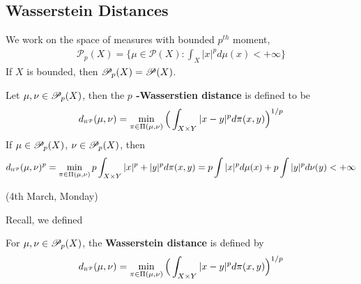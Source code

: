 \documentclass[12pt,a4paper]{article}
\begin{document}
\subsection{Wasserstein Distances}

We work on the space of measures with bounded $p^{th}$ moment,
\begin{align*}
\mathscr{P}_p(X) = \{ \mu \in \mathscr{P}(X) : \int_X |x|^p d\mu (x) < +\infty \}
\end{align*}
If $X$ is bounded, then $\mathscr{P}_p(X) = \mathscr{P}(X)$.
\s

 Let $\mu, \nu \in \mathscr{P}_p(X)$, then the \textbf{$p$ -Wasserstien distance} is defined to be
\begin{align*}
\wa{p}(\mu, \nu)= \min_{\pi \in \Pi(\mu, \nu)} \Big( \int_{X\times Y} |x-y|^p d\pi(x,y) \Big)^{1/p}
\end{align*}
If $\mu \in \mathscr{P}_p(X)$, $\nu \in  \mathscr{P}_p(X)$, then
\begin{align*}
\wa{p}(\mu, \nu)^p = \min_{\pi \in \Pi(\mu, \nu)} p\int_{X\times Y} |x|^p + |y|^p d\pi(x,y) = p\int |x|^p d\mu(x) + p \int |y|^p d\nu(y) < + \infty
\end{align*}
\s

\newday

(4th March, Monday)
\s

Recall, we defined

 For $\mu, \nu\in \mathscr{P}_p(X)$, the \textbf{Wasserstein distance} is defined by
\begin{align*}
\wa{p}(\mu, \nu)= \min_{\pi \in \Pi(\mu, \nu)} \Big( \int_{X\times Y} |x-y|^p d\pi(x,y) \Big)^{1/p}
\end{align*}
\s
\end{document}
